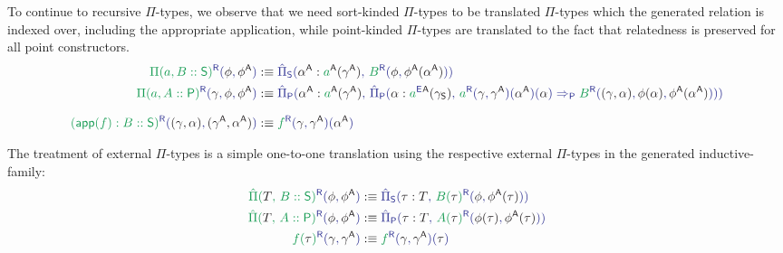 \begin{defn}
To continue to recursive $\Pi$-types, we observe that we need sort-kinded
$\Pi$-types to be translated $\Pi$-types which the generated relation is
indexed over, including the appropriate application,
while point-kinded $\Pi$-types are translated to the fact that
relatedness is preserved for all point constructors.
\begin{align*}
\tqm{\grm{\Pi(a, B :: \Sc)}^\RR(\blphi, \blphiCC)}
  &:\equiv \tqm{\ExtPiS{\blalphaCC : \grm{a}^\CC(\blgammaCC)}
    {\grm{B}^\RR(\blphi, \blm{\blphiCC(\blalphaCC)})}} \\
\tqm{\grm{\Pi(a, A :: \Pc)}^\RR(\blgamma, \blphi, \blphiCC)}
  &:\equiv \tqm{\ExtPiP{\blalphaCC : \grm{a}^\CC(\blgammaCC)}
    {\ExtPiP{\blalpha : \tqm{\grm{a}^\EE}^\CC(\gamma_\Sc)}
    {\grm{a}^\RR(\blgamma,\blgammaCC)(\blalphaCC)(\blalpha)
    \Rightarrow_\Pc \grm{B}^\RR(\blm{(\gamma, \alpha)}, \blm{\phi(\alpha)}, \blm{\blphiCC(\blalphaCC)}) }}  } \\[.7em]
\tqm{\grm{(\IIapp(f) : B :: \Sc)}^\RR(\blm{(\gamma, \alpha)},\blm{(\blgammaCC,\blalphaCC)})}
  &:\equiv \tqm{\grm{f}^\RR(\blgamma, \blgammaCC)(\blalphaCC) }
\end{align*}

The treatment of external $\Pi$-types is a simple one-to-one translation
using the respective external $\Pi$-types in the generated inductive-family:
\begin{align*}
\tqm{\grm{\ExtPi{T}{B :: \Sc}}^\RR(\blphi, \blphiCC)}
  &:\equiv \tqm{\ExtPiS{\tau : T}{\grm{B(\bltau)}^\RR(\blphi, \blm{\phi^\CC(\tau)})}} \\
\tqm{\grm{\ExtPi{T}{A :: \Pc}}^\RR(\blphi, \blphiCC)}
  &:\equiv \tqm{\ExtPiP{\tau : T}{\grm{A(\bltau)}^\RR(\blm{\phi(\tau)}, \blm{\phi^\CC(\tau)})}} \\
\tqm{\grm{f(\bltau)}^\RR(\blgamma, \blgammaCC)}
  &:\equiv \tqm{\grm{f}^\RR(\blgamma, \blgammaCC)(\bltau)}
\end{align*}


\end{defn}
